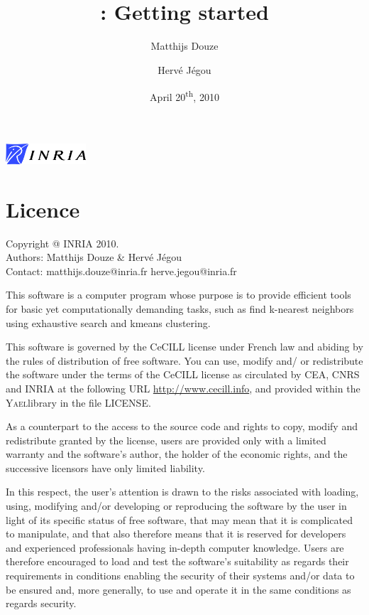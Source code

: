 \documentclass[a4paper,11pt,notitlepage,final,twoside]{report}
\title{~\vspace{9cm} \\ \yael: Getting started}
\author{Matthijs Douze \and Herv\'e J\'egou}
\date{April 20\textsuperscript{th}, 2010}
\newcommand{\yael}{\textsc{Yael}}
\begin{document}
\maketitle
\thispagestyle{empty}

\vfill

\includegraphics[width=3cm]{./figs/logoinria}


\newpage

\chapter*{Licence}

Copyright @ INRIA 2010. \\
Authors: Matthijs Douze \& Herv\'e J\'egou \\
Contact: matthijs.douze@inria.fr  herve.jegou@inria.fr \\
\medskip

This software is a computer program whose purpose is to provide 
efficient tools for basic yet computationally demanding tasks, 
such as find k-nearest neighbors using exhaustive search 
and kmeans clustering. 
\medskip

This software is governed by the CeCILL license under French law and
abiding by the rules of distribution of free software.  You can  use, 
modify and/ or redistribute the software under the terms of the CeCILL
license as circulated by CEA, CNRS and INRIA at the following URL
\url{http://www.cecill.info}, and provided within the \yael library 
in the file LICENSE. 
\medskip

As a counterpart to the access to the source code and  rights to copy,
modify and redistribute granted by the license, users are provided only
with a limited warranty  and the software's author,  the holder of the
economic rights,  and the successive licensors  have only  limited
liability. 
\medskip

In this respect, the user's attention is drawn to the risks associated
with loading,  using,  modifying and/or developing or reproducing the
software by the user in light of its specific status of free software,
that may mean  that it is complicated to manipulate,  and  that  also
therefore means  that it is reserved for developers  and  experienced
professionals having in-depth computer knowledge. Users are therefore
encouraged to load and test the software's suitability as regards their
requirements in conditions enabling the security of their systems and/or 
data to be ensured and,  more generally, to use and operate it in the 
same conditions as regards security. 
\medskip
\end{document}

